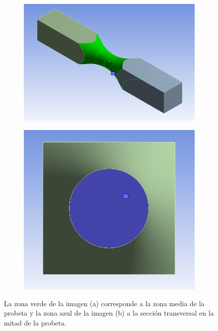 \begin{figure}[h]
\centering
	\begin{subfigure}{0.5\linewidth}
		\centering
		\includegraphics[width=0.82\linewidth]{Imagenes/zona_media.PNG}
		\caption{}\label{fig:zona_media}
	\end{subfigure}%
	\begin{subfigure}{0.5\linewidth}
		\centering
		\includegraphics[width=0.6\linewidth]{Imagenes/cara_corte.PNG}
		\caption{}\label{fig:cara_corte}
	\end{subfigure}%
\caption{La zona verde de la imagen (a) corresponde a la zona media de la probeta y la zona azul de la imagen (b) a la sección transversal en la mitad de la probeta.}
\label{fig:zona_probeta}
\end{figure}

